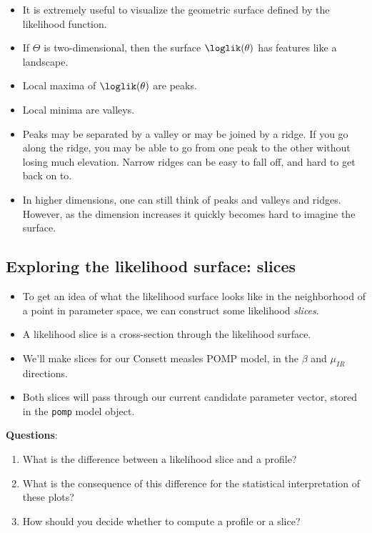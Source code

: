 \documentclass[
  letterpaper,
  DIV=11,
  numbers=noendperiod]{scrartcl}
\providecommand{\tightlist}{%
  \setlength{\itemsep}{0pt}\setlength{\parskip}{0pt}}\usepackage{longtable,booktabs,array}
\begin{document}
\begin{itemize}
\tightlist
\item
  It is extremely useful to visualize the geometric surface defined by
  the likelihood function.
\item
  If \(\Theta\) is two-dimensional, then the surface \(\loglik(\theta)\)
  has features like a landscape.
\item
  Local maxima of \(\loglik(\theta)\) are peaks.
\item
  Local minima are valleys.
\item
  Peaks may be separated by a valley or may be joined by a ridge. If you
  go along the ridge, you may be able to go from one peak to the other
  without losing much elevation. Narrow ridges can be easy to fall off,
  and hard to get back on to.
\item
  In higher dimensions, one can still think of peaks and valleys and
  ridges. However, as the dimension increases it quickly becomes hard to
  imagine the surface.
\end{itemize}

\hypertarget{exploring-the-likelihood-surface-slices}{%
\subsection{Exploring the likelihood surface:
slices}\label{exploring-the-likelihood-surface-slices}}

\begin{itemize}
\item
  To get an idea of what the likelihood surface looks like in the
  neighborhood of a point in parameter space, we can construct some
  likelihood \emph{slices}.
\item
  A likelihood slice is a cross-section through the likelihood surface.
\item
  We'll make slices for our Consett measles POMP model, in the \(\beta\)
  and \(\mu_{IR}\) directions.
\item
  Both slices will pass through our current candidate parameter vector,
  stored in the \texttt{pomp} model object.
\end{itemize}

\vfill

\textbf{Questions}:

\begin{enumerate}
\def\labelenumi{\arabic{enumi}.}
\item
  What is the difference between a likelihood slice and a profile?
\item
  What is the consequence of this difference for the statistical
  interpretation of these plots?
\item
  How should you decide whether to compute a profile or a slice?
\end{enumerate}
\end{document}
